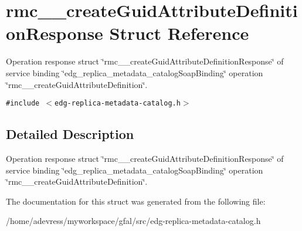 \section{rmc\_\-\_\-create\-Guid\-Attribute\-Definition\-Response Struct Reference}
\label{structrmc____createGuidAttributeDefinitionResponse}
Operation response struct \char`\"{}rmc\_\-\_\-create\-Guid\-Attribute\-Definition\-Response\char`\"{} of service binding \char`\"{}edg\_\-replica\_\-metadata\_\-catalog\-Soap\-Binding\char`\"{} operation \char`\"{}rmc\_\-\_\-create\-Guid\-Attribute\-Definition\char`\"{}.  


{\tt \#include $<$edg-replica-metadata-catalog.h$>$}



\subsection{Detailed Description}
Operation response struct \char`\"{}rmc\_\-\_\-create\-Guid\-Attribute\-Definition\-Response\char`\"{} of service binding \char`\"{}edg\_\-replica\_\-metadata\_\-catalog\-Soap\-Binding\char`\"{} operation \char`\"{}rmc\_\-\_\-create\-Guid\-Attribute\-Definition\char`\"{}. 



The documentation for this struct was generated from the following file:\begin{CompactItemize}
\item 
/home/adevress/myworkspace/gfal/src/edg-replica-metadata-catalog.h\end{CompactItemize}
